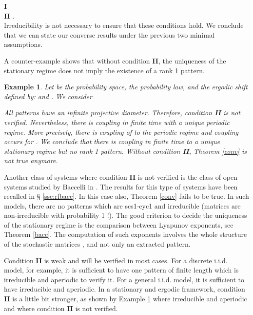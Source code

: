 \documentclass[11pt,titlepage]{article}
\newcommand{\parag}{\medskip\noindent}
\newtheorem{example}[theo]{Example }
\newenvironment{exam}{\begin{example}\rm}{\end{example}}
\begin{document}
\hspace*{1cm} {\bf I}  \\
\hspace*{1cm} {\bf II}  . \\

Irreducibility  is not necessary to 
ensure that these conditions hold. We conclude that we can state our converse
results under the previous two minimal assumptions.

\parag


A counter-example shows that without condition {\bf II},
the uniqueness
of the stationary regime does not imply the existence of a
rank 1 pattern.

\begin{exam}
\label{ex:cond2}
Let  be the probability space, 
 the
probability law, and  the ergodic shift defined by:  and .
We consider


All patterns have an infinite projective diameter. Therefore,
condition {\bf II} is not verified. Nevertheless,
there is coupling in finite 
time with a unique periodic regime. More precisely, 
there is coupling of 
to the periodic regime  
and coupling occurs for . 
We conclude that there is coupling in finite time to a
unique stationary regime but no rank 1 pattern. 
Without condition {\bf II}, Theorem \ref{conv} is
not true anymore. 
\end{exam}

Another class of systems where condition {\bf II} is not verified is the class
of open systems studied by Baccelli in 
\cite{bacc92}. The results for this type of systems have been recalled in \S
\ref{sse:rfbacc}. In this case also, Theorem \ref{conv} fails to
be true. In such models, there are no  patterns which are scs1-cyc1 and
irreducible (matrices are non-irreducible with probability 1 !).
The good criterion to decide
the uniqueness of the stationary regime is the comparison between Lyapunov 
exponents, see Theorem \ref{bacc}. The computation of such exponents involves
the whole structure of 
the stochastic matrices , and not only an extracted 
pattern. 


\parag
Condition {\bf II} is weak and will be verified in most cases.
For a discrete  i.i.d. model, for example, it is sufficient to have one pattern of finite length
 which is irreducible and aperiodic to verify it. For a general  i.i.d. model, it is sufficient to have
 irreducible and aperiodic. In a stationary and ergodic framework, condition {\bf II} is a little bit
stronger, as shown by Example \ref{ex:cond2} where  irreducible and aperiodic and where
condition {\bf II} is not verified.
\end{document}
